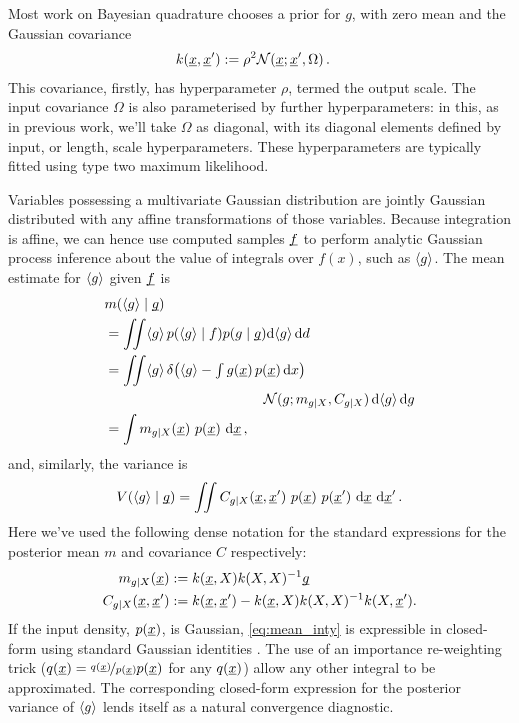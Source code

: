 \documentclass[twoside]{article}
\begin{document}
Most work on Bayesian quadrature chooses a \gp prior for $g$, with zero mean and the Gaussian covariance 
\begin{align} \label{eq:Gaussian_cov_fn}
k(\underline{\smash{x}},\underline{\smash{x}}') & := \rho^2 \mathcal{N}(\underline{\smash{x}};\underline{\smash{x}}',\Omega)\,.
\end{align} 
This covariance, firstly, has hyperparameter $\rho$, 
termed the output scale. The input covariance $\Omega$ is also parameterised by further hyperparameters: in this, as in previous work, we'll take $\Omega$ as diagonal, with its diagonal elements defined by input, or length, scale hyperparameters.  These hyperparameters are typically fitted using type two maximum likelihood.

Variables possessing a multivariate Gaussian distribution are jointly Gaussian distributed with any affine transformations of those variables. Because integration is affine, we can hence use computed samples $\underline{\smash{f}}$ to perform analytic Gaussian process inference about the value of integrals over $f(x)$, such as $\langle g \rangle$. The mean estimate for $\langle g \rangle$ given $\underline{\smash{f}}$ is
%
\begin{align} 
&
\mean{\inty{g}}{\v{g}} 
\nonumber\\
& =\iint \inty{g}\,\p{\inty{g}}{f}\p{g}{\v{g}} \ud \inty{g} \,\ud d                                                                                                                                                               \nonumber\\
&
 =\iint \inty{g}\,\delta\bigl(\inty{g} - {\textstyle\int g(\vx)\,p(\vx)\,\ud x}\bigr)
\nonumber\\
& \hspace{4cm}
\N{g}{m_{g|X}}{C_{g|X}}\,\ud \inty{g} \,\ud g 
\nonumber\\
&
 = \int m_{g|X}(\vx)~p(\vx)~\ud \vx
\,, \label{eq:mean_inty}
\end{align}
and, similarly, the variance is
\begin{align} 
V(\langle g \rangle\mid\underline{\smash{g}})
=\iint C_{g|X}(\underline{\smash{x}}, \underline{\smash{x}}')~p(\underline{\smash{x}})~p(\underline{\smash{x}}')~\mathrm{d} \underline{\smash{x}}~\mathrm{d} \underline{\smash{x}}'
\,. \label{eq:var_inty}
\end{align}
Here we've used the following dense notation for the standard \gp expressions for the posterior mean $m$ and covariance $C$ respectively:
\begin{align}
m_{g|X}(\underline{\smash{x}})& := k(\underline{\smash{x}}, X) k(X, X)^{-1} \underline{\smash{g}}\\
C_{g|X}(\underline{\smash{x}}, \underline{\smash{x}}')& := k(\underline{\smash{x}}, \underline{\smash{x}}') - k(\underline{\smash{x}}, X) k(X, X)^{-1} k(X, \underline{\smash{x}}').
\end{align}
If the input density, $p(\underline{\smash{x}})$, is Gaussian, \eqref{eq:mean_inty} is expressible in closed-form using standard Gaussian identities \citep{BZMonteCarlo}.
The use of an importance re-weighting trick ($q(\underline{\smash{x}}) = \nicefrac{q(\underline{\smash{x}})}{p(\underline{\smash{x}})} p(\underline{\smash{x}})$ for any $q(\underline{\smash{x}})$) allow any other integral to be approximated. 
%
The corresponding closed-form expression for the posterior variance of $\langle g \rangle$ lends itself as a natural convergence diagnostic. 
\end{document}
